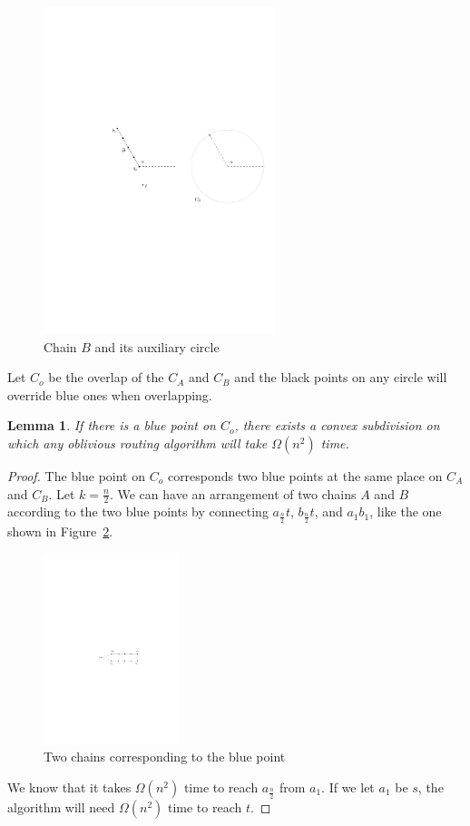 \documentclass [letterpaper] {patmorin}
\newtheorem{lemma}{Lemma}%
\begin{document}
\begin{figure}[ht]
  \centering
  \includegraphics[width=0.6\textwidth]{pics/bchaincircle.pdf}
  \caption{Chain $B$ and its auxiliary circle}
  \label{fig:bcircle}
\end{figure}
Let $C_{o}$ be the overlap of the $C_{A}$ and $C_{B}$ and the black points on any circle will override blue ones when overlapping.

\begin{lemma}
  \label{lem:1blue}
  If there is a blue point on $C_{o}$, there exists a convex subdivision on which any oblivious routing algorithm will take $\Omega (n^{2})$ time.
\end{lemma}

\begin{proof}
  The blue point on $C_{o}$ corresponds two blue points at the same place on $C_{A}$ and $C_{B}$. Let $k = \frac{n}{2}$. We can have an arrangement of two chains $A$ and $B$ according to the two blue points by connecting $a_{\frac{n}{2}}t$, $b_{\frac{n}{2}}t$, and $a_{1}b_{1}$, like the one shown in Figure~\ref{fig:1blue}.
\begin{figure}[ht]
  \centering
  \includegraphics[width=0.35\textwidth]{pics/1blue.pdf}
  \caption{Two chains corresponding to the blue point }
  \label{fig:1blue}
\end{figure}
We know that it takes $\Omega (n^{2})$ time to reach $a_{\frac{n}{2}}$ from $a_{1}$. If we let $a_{1}$ be $s$, the algorithm will need $\Omega (n^{2})$ time to reach $t$.
\end{proof}
\end{document}
